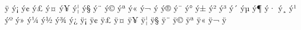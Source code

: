 ^^ff^^99{\armnum}%
%
%
^^fd^^a1{\Armayb}%
^^fd^^a2{\Armben}%
^^fd^^a3{\Armgim}%
^^fd^^a4{\Armda}%
^^fd^^a5{\Armyech}%
^^fd^^a6{\Armza}%
^^fd^^a7{\Arme}%
^^fd^^a8{\Armat}%
^^fd^^a9{\Armto}%
^^fd^^aa{\Armzhe}%
^^fd^^ab{\Armini}%
^^fd^^ac{\Armlyun}%
^^fd^^ad{\Armkhe}%
^^fd^^ae{\Armtsa}%
^^fd^^af{\Armken}%
^^fd^^b0{\Armho}%
^^fd^^b1{\Armdza}%
^^fd^^b2{\Armghat}%
^^fd^^b3{\Armtche}%
^^fd^^b4{\Armmen}%
^^fd^^b5{\Armhi}%
^^fd^^b6{\Armnu}%
^^fd^^b7{\Armsha}%
^^fd^^b8{\Armvo}%
^^fd^^b9{\Armcha}%
^^fd^^ba{\Armpe}%
^^fd^^bb{\Armje}%
^^fd^^bc{\Armra}%
^^fd^^bd{\Armse}%
^^fd^^be{\Armvev}%
^^fd^^bf{\Armtyun}%
%
^^ff^^a1{\armayb}%
^^ff^^a2{\armben}%
^^ff^^a3{\armgim}%
^^ff^^a4{\armda}%
^^ff^^a5{\armyech}%
^^ff^^a6{\armza}%
^^ff^^a7{\arme}%
^^ff^^a8{\armat}%
^^ff^^a9{\armto}%
^^ff^^aa{\armzhe}%
^^ff^^ab{\armini}%
^^ff^^ac{\armlyun}%
^^ff^^ad{\armkhe}%
